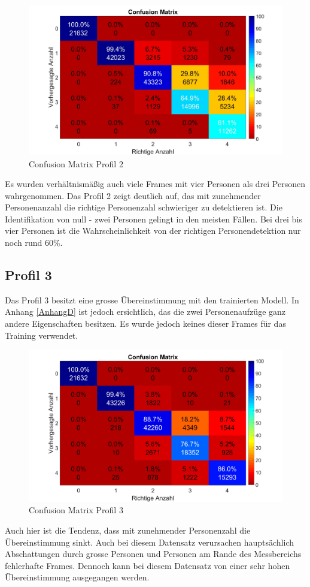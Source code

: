 \begin{figure}[H]
	\centering
		\label{fig:profil2}
	\includegraphics[width=0.55\linewidth]{fig/Profil_2m}
	\caption[Confusion Matrix Profil 2]{Confusion Matrix Profil 2}

\end{figure}
 Es wurden verhältnismäßig auch viele Frames mit vier Personen als drei Personen wahrgenommen. Das Profil 2 zeigt deutlich auf, das mit zunehmender Personenanzahl die richtige Personenzahl schwieriger zu detektieren ist. Die Identifikation von null - zwei Personen gelingt in den meisten Fällen. Bei drei bis vier Personen ist die Wahrscheinlichkeit von der richtigen Personendetektion nur noch rund 60\%.

\subsection{Profil 3}
\label{subsec:Profil3}
Das Profil 3 besitzt eine grosse Übereinstimmung mit den trainierten Modell. In Anhang \ref{AnhangD} ist jedoch ersichtlich, das die zwei  Personenaufzüge ganz andere Eigenschaften besitzen. Es wurde jedoch keines dieser Frames für das Training verwendet.

\begin{figure}[H]
	\centering
	\includegraphics[width=0.55\linewidth]{fig/Profil_3m}
	\caption[Confusion Matrix Profil 3]{Confusion Matrix Profil 3}
		\label{fig:profil3}
\end{figure}

Auch hier ist die Tendenz, dass mit zunehmender Personenzahl die Übereinstimmung sinkt. Auch bei diesem Datensatz verursachen hauptsächlich Abschattungen durch grosse Personen und Personen am Rande des Messbereichs fehlerhafte Frames. Dennoch kann bei diesem Datensatz von einer sehr hohen Übereinstimmung  ausgegangen werden.

